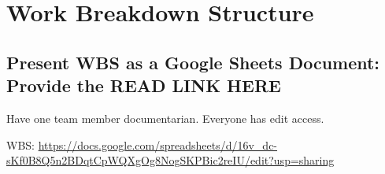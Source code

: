 \section{Work Breakdown Structure}

\subsection{Present WBS as a Google Sheets Document: Provide the READ LINK HERE}
Have one team member documentarian. Everyone has edit access.

WBS: \url{https://docs.google.com/spreadsheets/d/16v_dc-sKf0B8Q5n2BDqtCpWQXgOg8NogSKPBic2reIU/edit?usp=sharing}